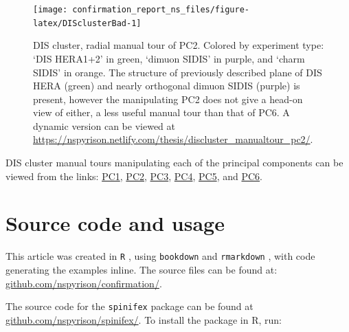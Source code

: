 \documentclass{monashthesis}
\begin{document}
\begin{figure}

{\centering \texttt{[image: confirmation\_report\_ns\_files/figure-latex/DISclusterBad-1]} 

}

\caption{DIS cluster, radial manual tour of PC2. Colored
by experiment type: `DIS HERA1+2' in green, `dimuon SIDIS' in purple,
and `charm SIDIS' in orange. The structure of previously described plane
of DIS HERA (green) and nearly orthogonal dimuon SIDIS (purple) is
present, however the manipulating PC2 does not give a head-on view of
either, a less useful manual tour than that of PC6. A dynamic version
can be viewed at
\url{https://nspyrison.netlify.com/thesis/discluster_manualtour_pc2/}.}\label{fig:DISclusterBad}
\end{figure}

DIS cluster manual tours manipulating each of the principal components
can be viewed from the links:
\href{https://nspyrison.netlify.com/thesis/discluster_manualtour_pc1/}{PC1},
\href{https://nspyrison.netlify.com/thesis/discluster_manualtour_pc2/}{PC2},
\href{https://nspyrison.netlify.com/thesis/discluster_manualtour_pc3/}{PC3},
\href{https://nspyrison.netlify.com/thesis/discluster_manualtour_pc4/}{PC4},
\href{https://nspyrison.netlify.com/thesis/discluster_manualtour_pc5/}{PC5},
and
\href{https://nspyrison.netlify.com/thesis/discluster_manualtour_pc6/}{PC6}.

\section{Source code and usage}\label{source-code-and-usage}

This article was created in \texttt{R} \autocite{r_core_team_r:_2018},
using \texttt{bookdown} \autocite{xie_bookdown:_2016} and
\texttt{rmarkdown} \autocite{xie_r_2018}, with code generating the
examples inline. The source files can be found at:
\href{https://github.com/nspyrison/confirmation/}{github.com/nspyrison/confirmation/}.

The source code for the \texttt{spinifex} package can be found at
\href{https://github.com/nspyrison/spinifex/}{github.com/nspyrison/spinifex/}.
To install the package in R, run:

\begin{Shaded}
\begin{Highlighting}[]
\OperatorTok{::}\NormalTok{(}\NormalTok{)}
\end{Highlighting}
\end{Shaded}
\end{document}
